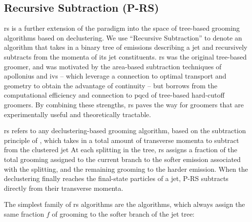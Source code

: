 \subsection{Recursive Subtraction (P-RS)}
\label{sec:recursive-subtraction}

\gls{rs} is a further extension of the \PIRANHA{} paradigm into the space of tree-based grooming algorithms based on \gls{declustering}.
%
We use ``Recursive Subtraction'' to denote an algorithm that takes in a binary tree of emissions describing a jet and recursively subtracts from the momenta of its jet constituents.
%
\gls{rs} was the original tree-based \PIRANHA{} groomer, and was motivated by the area-based subtraction techniques of \gls{apollonius} and \gls{ivs} -- which leverage a connection to optimal transport and geometry to obtain the advantage of continuity -- but borrows from the computational efficiency and connection to \gls{pqcd} of tree-based hard-cutoff groomers.
%
By combining these strengths, \gls{rs} paves the way for \PIRANHA{} groomers that are experimentally useful and theoretically tractable.


\begin{definitionbox}{}{}
    \gls{rs} refers to any \gls{declustering}-based grooming algorithm, based on the subtraction principle of \PIRANHA{}, which takes in a total amount of transverse momenta to subtract from the clustered jet
    At each splitting in the tree, \gls{rs} assigns a fraction of the total grooming assigned to the current branch to the softer emission associated with the splitting, and the remaining grooming to the harder emission.
    When the \gls{declustering} finally reaches the final-state particles of a jet, P-RS subtracts directly from their transverse momenta.
\end{definitionbox}


The simplest family of \gls{rs} algorithms are the  algorithms, which always assign the same fraction \(f\) of grooming to the softer branch of the jet tree:



